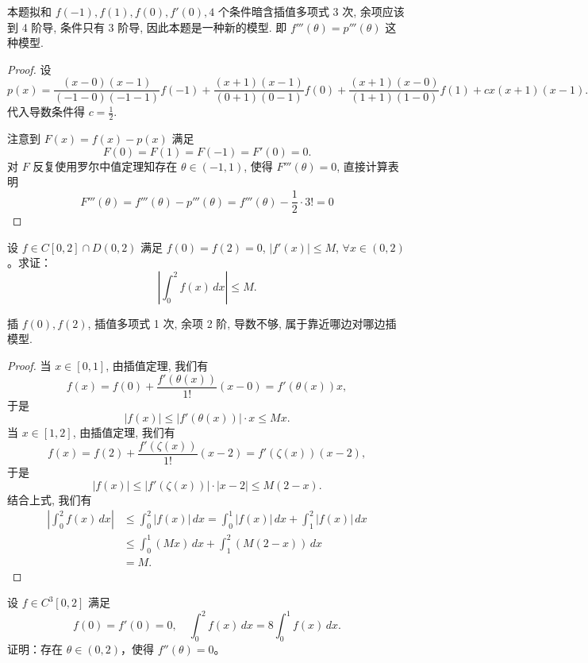 \documentclass[lang=cn,10pt,thmcnt=section]{elegantbook}
\begin{document}
\begin{remark}
	本题拟和 $f(-1), f(1), f(0), f'(0), 4$ 个条件暗含插值多项式 3 次, 余项应该到 4 阶导, 条件只有 3 阶导, 因此本题是一种新的模型. 即 $f'''(\theta) = p'''(\theta)$ 这种模型.

\end{remark}
\begin{proof}
	设
\[
p(x) = \frac{(x-0)(x-1)}{(-1-0)(-1-1)}f(-1) + \frac{(x+1)(x-1)}{(0+1)(0-1)}f(0) + \frac{(x+1)(x-0)}{(1+1)(1-0)}f(1) + cx(x+1)(x-1).
\]
代入导数条件得 $c = \frac{1}{2}$.

注意到 $F(x) = f(x) - p(x)$ 满足
\begin{equation}
F(0) = F(1) = F(-1) = F'(0) = 0. \tag{10.9}
\end{equation}
对 $F$ 反复使用罗尔中值定理知存在 $\theta \in (-1, 1)$, 使得 $F'''(\theta)=0$, 直接计算表明
\begin{equation}
F'''(\theta) = f'''(\theta) - p'''(\theta) = f'''(\theta) - \frac{1}{2} \cdot 3! = 0
\end{equation}

\end{proof}
\begin{example}
	设 \(f \in C[0, 2] \cap D(0, 2)\) 满足 \(f(0) = f(2) = 0\), \(|f'(x)| \leq M\), \(\forall x \in (0, 2)\)。求证：
\[ \left| \int_{0}^{2} f(x) \, dx \right| \leq M. \]
\end{example}

\begin{remark}
	插 $f(0), f(2)$, 插值多项式 1 次, 余项 2 阶, 导数不够, 属于靠近哪边对哪边插模型.
\end{remark}
\begin{proof}
	当 $x \in [0, 1]$, 由插值定理, 我们有
\[
f(x) = f(0) + \frac{f'(\theta(x))}{1!}(x-0) = f'(\theta(x))x,
\]
于是
\[
|f(x)| \le |f'(\theta(x))| \cdot x \le Mx.
\]
当 $x \in [1, 2]$, 由插值定理, 我们有
\[
f(x) = f(2) + \frac{f'(\zeta(x))}{1!}(x-2) = f'(\zeta(x))(x-2),
\]
于是
\[
|f(x)| \le |f'(\zeta(x))| \cdot |x-2| \le M(2-x).
\]
结合上式, 我们有
\begin{align*}
    \left| \int_0^2 f(x) \,dx \right| &\le \int_0^2 |f(x)| \,dx = \int_0^1 |f(x)| \,dx + \int_1^2 |f(x)| \,dx \\
    &\le \int_0^1 (Mx) \,dx + \int_1^2 (M(2-x)) \,dx \\
    &= M.
\end{align*}

\end{proof}
\begin{example}
	设 \( f \in C^3[0,2] \) 满足
\[ f(0) = f'(0) = 0, \quad \int_{0}^{2} f(x) \, dx = 8 \int_{0}^{1} f(x) \, dx. \]
证明：存在 \( \theta \in (0,2) \)，使得 \( f''(\theta) = 0 \)。
\end{example}
\end{document}
